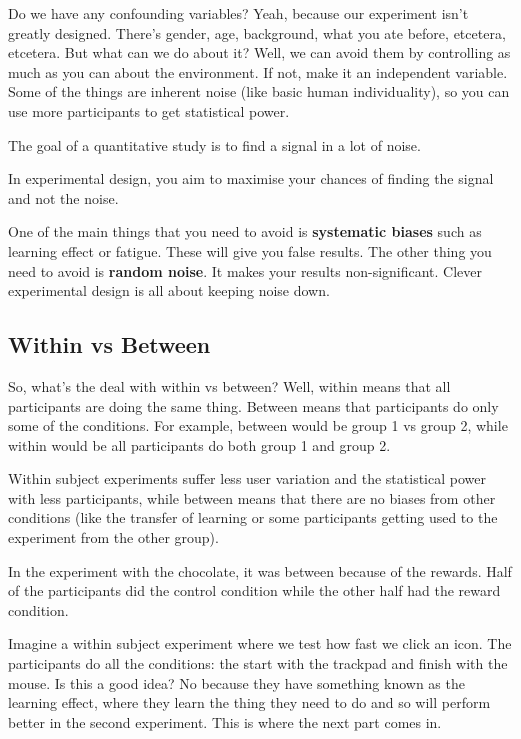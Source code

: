 \documentclass[11pt,a4paper,titlepage]{scrartcl}
\begin{document}
Do we have any confounding variables? Yeah, because our experiment isn't
greatly designed. There's gender, age, background, what you ate before,
etcetera, etcetera. But what can we do about it? Well, we can avoid them
by controlling as much as you can about the environment. If not, make it
an independent variable. Some of the things are inherent noise (like basic
human individuality), so you can use more participants to get statistical
power.

The goal of a quantitative study is to find a signal in a lot of noise.

In experimental design, you aim to maximise your chances of finding the
signal and not the noise.

One of the main things that you need to avoid is \textbf{systematic
biases} such as learning effect or fatigue. These will give you false
results. The other thing you need to avoid is \textbf{random noise}. It
makes your results non-significant. Clever experimental design is all
about keeping noise down.

\subsection{Within vs Between}%
\label{sub:within-between}

So, what's the deal with within vs between? Well, within means that all
participants are doing the same thing. Between means that participants do
only some of the conditions. For example, between would be group 1 vs
group 2, while within would be all participants do both group 1 and group
2.

Within subject experiments suffer less user variation and the statistical
power with less participants, while between means that there are no biases
from other conditions (like the transfer of learning or some participants
getting used to the experiment from the other group).

In the experiment with the chocolate, it was between because of the
rewards. Half of the participants did the control condition while the
other half had the reward condition.

Imagine a within subject experiment where we test how fast we click an
icon. The participants do all the conditions: the start with the trackpad
and finish with the mouse. Is this a good idea? No because they have
something known as the learning effect, where they learn the thing they
need to do and so will perform better in the second experiment. This is
where the next part comes in.
\end{document}
